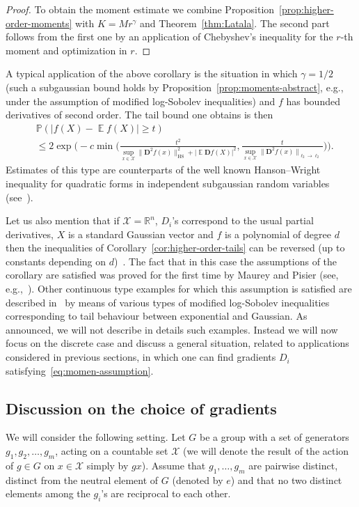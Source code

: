 \documentclass[a4paper]{amsart}
\theoremstyle{definition}
\theoremstyle{remark}
\numberwithin{equation}{section}
\newcommand*{\RR}{\mathbb{R}}
\newcommand{\calX}{\mathcal{X}}
\newcommand*{\HS}{\text{HS}}
\DeclareMathOperator{\EE}{\mathbb{E}} %
\newcommand*{\PP}{\mathbb{P}} %
\begin{document}
\begin{proof}
To obtain the moment estimate we combine Proposition~\ref{prop:higher-order-moments} with $K = Mr^\gamma$ and Theorem~\ref{thm:Latala}. The second part follows from the first one by an application of Chebyshev's inequality for the $r$-th moment and optimization in $r$.
\end{proof}
A typical application of the above corollary is the situation in which $\gamma = 1/2$ (such a subgaussian bound holds by Proposition~\ref{prop:moments-abstract}, e.g., under the assumption of modified log-Sobolev inequalities) and $f$ has bounded derivatives of second order. The tail bound one obtains is then
\begin{align*}
&\PP(|f(X) - \EE f(X)| \ge t) \\
&\le 2\exp\Big(-c\min\Big(\frac{t^2}{\sup_{x \in \mathcal{X}} \|\mathbf{D}^2 f(x)\|_{\HS}^2  + |\EE \mathbf{D} f(X)|^2},\frac{t}{\sup_{x\in \mathcal{X}} \|\mathbf{D}^2 f(x)\|_{\ell_2\to\ell_2}}\Big)\Big).
\end{align*}
Estimates of this type are counterparts of the well known Hanson--Wright inequality for quadratic forms in independent subgaussian random variables (see~\cite{MR0279864,MR1686370}).

Let us also mention that if $\mathcal{X} = \RR^n$, $D_i$'s correspond to the usual partial derivatives, $X$ is a standard Gaussian vector and $f$ is a polynomial of degree $d$ then the inequalities of Corollary~\ref{cor:higher-order-tails} can be reversed (up to constants depending on $d$)~\cite{MR3383337}. The fact that in this case the assumptions of the corollary are satisfied was proved for the first time by Maurey and Pisier (see, e.g.,~\cite{MR1036275}). Other continuous type examples for which this assumption is satisfied are described in~\cite{MR3383337, MR3743923} by means of various types of modified log-Sobolev inequalities corresponding to tail behaviour between exponential and Gaussian. As announced, we will not describe in details such examples. Instead we will now focus on the discrete case and discuss a general situation, related to applications considered in previous sections, in which one can find gradients $D_i$ satisfying~\eqref{eq:momen-assumption}.

\subsection{Discussion on the choice of gradients}
We will consider the following setting. Let $G$ be a group with a set of generators $g_1,g_2,\ldots,g_m$, acting on a countable set $\calX$ (we will denote the result of the action of $g \in G$ on $x\in \calX$ simply by $gx$). Assume that $g_1,\ldots,g_m$ are pairwise distinct, distinct from the neutral element of $G$ (denoted by $e$) and that no two distinct elements  among the $g_i$'s are reciprocal to each other.
\end{document}

